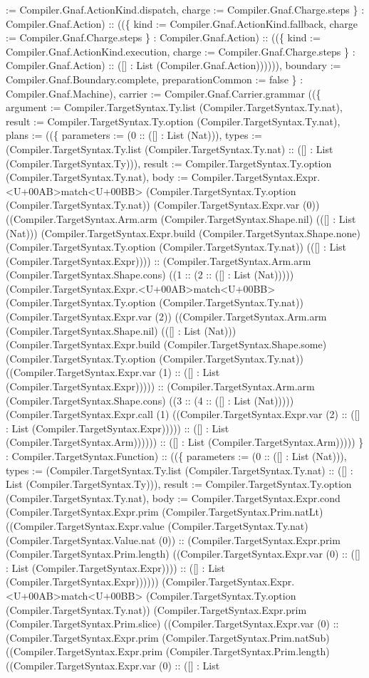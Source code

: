 \documentclass[11pt]{article}
\begin{document}
:= Compiler.Gnaf.ActionKind.dispatch, charge := Compiler.Gnaf.Charge.steps \} : Compiler.Gnaf.Action) :: ((\{ kind := Compiler.Gnaf.ActionKind.fallback, charge := Compiler.Gnaf.Charge.steps \} : Compiler.Gnaf.Action) :: ((\{ kind := Compiler.Gnaf.ActionKind.execution, charge := Compiler.Gnaf.Charge.steps \} : Compiler.Gnaf.Action) :: ([] : List (Compiler.Gnaf.Action)))))), boundary := Compiler.Gnaf.Boundary.complete, preparationCommon := false \} : Compiler.Gnaf.Machine), carrier := Compiler.Gnaf.Carrier.grammar ((\{ argument := Compiler.TargetSyntax.Ty.list (Compiler.TargetSyntax.Ty.nat), result := Compiler.TargetSyntax.Ty.option (Compiler.TargetSyntax.Ty.nat), plans := ((\{ parameters := (0 :: ([] : List (Nat))), types := (Compiler.TargetSyntax.Ty.list (Compiler.TargetSyntax.Ty.nat) :: ([] : List (Compiler.TargetSyntax.Ty))), result := Compiler.TargetSyntax.Ty.option (Compiler.TargetSyntax.Ty.nat), body := Compiler.TargetSyntax.Expr.<U+00AB>match<U+00BB> (Compiler.TargetSyntax.Ty.option (Compiler.TargetSyntax.Ty.nat)) (Compiler.TargetSyntax.Expr.var (0)) ((Compiler.TargetSyntax.Arm.arm (Compiler.TargetSyntax.Shape.nil) (([] : List (Nat))) (Compiler.TargetSyntax.Expr.build (Compiler.TargetSyntax.Shape.none) (Compiler.TargetSyntax.Ty.option (Compiler.TargetSyntax.Ty.nat)) (([] : List (Compiler.TargetSyntax.Expr)))) :: (Compiler.TargetSyntax.Arm.arm (Compiler.TargetSyntax.Shape.cons) ((1 :: (2 :: ([] : List (Nat))))) (Compiler.TargetSyntax.Expr.<U+00AB>match<U+00BB> (Compiler.TargetSyntax.Ty.option (Compiler.TargetSyntax.Ty.nat)) (Compiler.TargetSyntax.Expr.var (2)) ((Compiler.TargetSyntax.Arm.arm (Compiler.TargetSyntax.Shape.nil) (([] : List (Nat))) (Compiler.TargetSyntax.Expr.build (Compiler.TargetSyntax.Shape.some) (Compiler.TargetSyntax.Ty.option (Compiler.TargetSyntax.Ty.nat)) ((Compiler.TargetSyntax.Expr.var (1) :: ([] : List (Compiler.TargetSyntax.Expr))))) :: (Compiler.TargetSyntax.Arm.arm (Compiler.TargetSyntax.Shape.cons) ((3 :: (4 :: ([] : List (Nat))))) (Compiler.TargetSyntax.Expr.call (1) ((Compiler.TargetSyntax.Expr.var (2) :: ([] : List (Compiler.TargetSyntax.Expr))))) :: ([] : List (Compiler.TargetSyntax.Arm)))))) :: ([] : List (Compiler.TargetSyntax.Arm))))) \} : Compiler.TargetSyntax.Function) :: ((\{ parameters := (0 :: ([] : List (Nat))), types := (Compiler.TargetSyntax.Ty.list (Compiler.TargetSyntax.Ty.nat) :: ([] : List (Compiler.TargetSyntax.Ty))), result := Compiler.TargetSyntax.Ty.option (Compiler.TargetSyntax.Ty.nat), body := Compiler.TargetSyntax.Expr.cond (Compiler.TargetSyntax.Expr.prim (Compiler.TargetSyntax.Prim.natLt) ((Compiler.TargetSyntax.Expr.value (Compiler.TargetSyntax.Ty.nat) (Compiler.TargetSyntax.Value.nat (0)) :: (Compiler.TargetSyntax.Expr.prim (Compiler.TargetSyntax.Prim.length) ((Compiler.TargetSyntax.Expr.var (0) :: ([] : List (Compiler.TargetSyntax.Expr)))) :: ([] : List (Compiler.TargetSyntax.Expr)))))) (Compiler.TargetSyntax.Expr.<U+00AB>match<U+00BB> (Compiler.TargetSyntax.Ty.option (Compiler.TargetSyntax.Ty.nat)) (Compiler.TargetSyntax.Expr.prim (Compiler.TargetSyntax.Prim.slice) ((Compiler.TargetSyntax.Expr.var (0) :: (Compiler.TargetSyntax.Expr.prim (Compiler.TargetSyntax.Prim.natSub) ((Compiler.TargetSyntax.Expr.prim (Compiler.TargetSyntax.Prim.length) ((Compiler.TargetSyntax.Expr.var (0) :: ([] : List 
\end{document}
